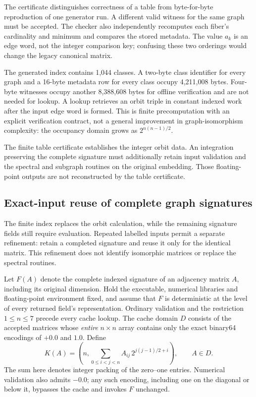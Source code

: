 \documentclass[11pt,a4paper]{article}
\theoremstyle{definition}\newtheorem{definition}[theorem]{Definition}
\begin{document}
The certificate distinguishes correctness of a table from byte-for-byte reproduction of one generator run. A different valid witness for the same graph must be accepted. The checker also independently recomputes each fiber's cardinality and minimum and compares the stored metadata. The value $a_k$ is an edge word, not the integer comparison key; confusing these two orderings would change the legacy canonical matrix.

The generated index contains 1,044 classes. A two-byte class identifier for every graph and a 16-byte metadata row for every class occupy 4,211,008 bytes. Four-byte witnesses occupy another 8,388,608 bytes for offline verification and are not needed for lookup. A lookup retrieves an orbit triple in constant indexed work after the input edge word is formed. This is finite precomputation with an explicit verification contract, not a general improvement in graph-isomorphism complexity: the occupancy domain grows as $2^{n(n-1)/2}$.

The finite table certificate establishes the integer orbit data. An integration preserving the complete signature must additionally retain input validation and the spectral and subgraph routines on the original embedding. Those floating-point outputs are not reconstructed by the table certificate.

\subsection{Exact-input reuse of complete graph signatures}\label{sec:signaturecache}
The finite index replaces the orbit calculation, while the remaining signature fields still require evaluation. Repeated labelled inputs permit a separate refinement: retain a completed signature and reuse it only for the identical matrix. This refinement does not identify isomorphic matrices or replace the spectral routines.

Let $F(A)$ denote the complete indexed signature of an adjacency matrix $A$, including its original dimension. Hold the executable, numerical libraries and floating-point environment fixed, and assume that $F$ is deterministic at the level of every returned field's representation. Ordinary validation and the restriction $1\leq n\leq7$ precede every cache lookup. The cache domain $D$ consists of the accepted matrices whose \emph{entire} $n\times n$ array contains only the exact binary64 encodings of $+0.0$ and $1.0$. Define
\[
 K(A)=\left(n,\sum_{0\leq i<j<n} A_{ij}\,2^{j(j-1)/2+i}\right),\qquad A\in D.
\]
The sum here denotes integer packing of the zero--one entries. Numerical validation also admits $-0.0$; any such encoding, including one on the diagonal or below it, bypasses the cache and invokes $F$ unchanged.
\end{document}
